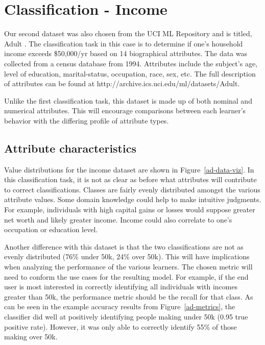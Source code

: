 \documentclass{sig-alternate}
\begin{document}
\section{Classification - Income}

Our second dataset was also chosen from the UCI ML Repository and is titled, Adult \cite{Bache+Lichman:2013}. The classification task in this case is to determine if one's household income exceeds \$50,000/yr based on 14 biographical attributes. The data was collected from a census database from 1994. Attributes include the subject's age, level of education, marital-status, occupation, race, sex, etc. The full description of attributes can be found at http://archive.ics.uci.edu/ml/datasets/Adult.

Unlike the first classification task, this dataset is made up of both nominal and numerical attributes. This will encourage comparisons between each learner's behavior with the differing profile of attribute types.

\subsection{Attribute characteristics}

Value distributions for the income dataset are shown in Figure~\ref{ad-data-viz}. In this classification task, it is not as clear as before what attributes will contribute to correct classifications. Classes are fairly evenly distributed amongst the various attribute values. Some domain knowledge could help to make intuitive judgments. For example, individuals with high capital gains or losses would suppose greater net worth and likely greater income. Income could also correlate to one's occupation or education level.

Another difference with this dataset is that the two classifications are not as evenly distributed (76\% under 50k, 24\% over 50k). This will have implications when analyzing the performance of the various learners. The chosen metric will need to conform the use cases for the resulting model. For example, if the end user is most interested in correctly identifying all individuals with incomes greater than 50k, the performance metric should be the recall for that class. As can be seen in the example accuracy results from Figure~\ref{ad-metrics}, the classifier did well at positively identifying people making under 50k (0.95 true positive rate). However, it was only able to correctly identify 55\% of those making over 50k.
\end{document}

